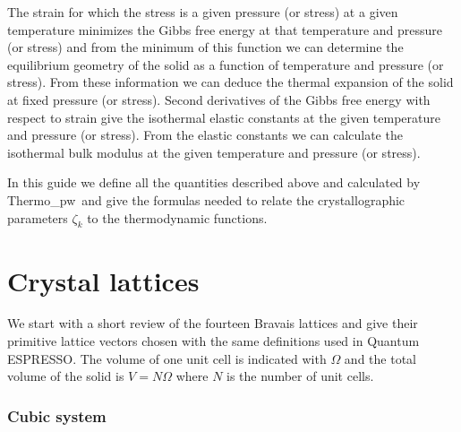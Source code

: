 \documentclass[12pt,a4paper,twoside]{report}
\def\qe{{\sc Quantum ESPRESSO}}
\def\tpw{{\sc Thermo}\_{\sc pw}}
\begin{document}
The strain for which the stress is a given pressure (or stress) at a given
temperature minimizes the Gibbs free energy at that temperature and
pressure (or stress) and from the minimum of this function we can determine 
the equilibrium geometry of the solid as a function of temperature and 
pressure (or stress). 
From these information we can deduce the thermal expansion of the 
solid at fixed pressure (or stress). Second derivatives of the Gibbs free
energy with respect to strain give the isothermal elastic constants at the 
given temperature and pressure (or stress). From the elastic constants 
we can calculate the isothermal bulk modulus at the
given temperature and pressure (or stress).

In this guide we define all the quantities described above and calculated 
by \tpw\ and give the formulas needed to relate the crystallographic
parameters $\zeta_k$ to the thermodynamic functions.

\newpage

{\color{dark-blue}\chapter{Crystal lattices}}
\color{black}

We start with a short review of the fourteen Bravais lattices and 
give their primitive lattice vectors chosen with the same definitions used
in \qe. 
The volume of one unit cell is indicated with $\Omega$ and the total 
volume of the solid is $V=N\Omega$ where $N$ is the number of unit cells.

{\color{web-blue}\subsection{Cubic system}}
\color{black}
\end{document}
